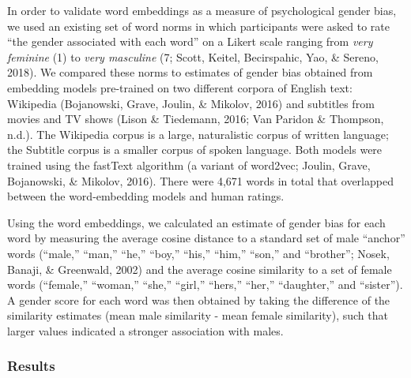 \documentclass[man,floatsintext]{apa6}
\begin{document}
In order to validate word embeddings as a measure of psychological gender bias, we used an existing set of word norms in which participants were asked to rate \enquote{the gender associated with each word} on a Likert scale ranging from \emph{very feminine} (1) to \emph{very masculine} (7; Scott, Keitel, Becirspahic, Yao, \& Sereno, 2018). We compared these norms to estimates of gender bias obtained from embedding models pre-trained on two different corpora of English text: Wikipedia (Bojanowski, Grave, Joulin, \& Mikolov, 2016) and subtitles from movies and TV shows (Lison \& Tiedemann, 2016; Van Paridon \& Thompson, n.d.). The Wikipedia corpus is a large, naturalistic corpus of written language; the Subtitle corpus is a smaller corpus of spoken language. Both models were trained using the fastText algorithm (a variant of word2vec; Joulin, Grave, Bojanowski, \& Mikolov, 2016). There were 4,671 words in total that overlapped between the word-embedding models and human ratings.

Using the word embeddings, we calculated an estimate of gender bias for each word by measuring the average cosine distance to a standard set of male \enquote{anchor} words (\enquote{male,} \enquote{man,} \enquote{he,} \enquote{boy,} \enquote{his,} \enquote{him,} \enquote{son,} and \enquote{brother}; Nosek, Banaji, \& Greenwald, 2002) and the average cosine similarity to a set of female words (\enquote{female,} \enquote{woman,} \enquote{she,} \enquote{girl,} \enquote{hers,} \enquote{her,} \enquote{daughter,} and \enquote{sister}). A gender score for each word was then obtained by taking the difference of the similarity estimates (mean male similarity - mean female similarity), such that larger values indicated a stronger association with males.

\hypertarget{results-1}{%
\subsubsection{Results}\label{results-1}}
\end{document}
